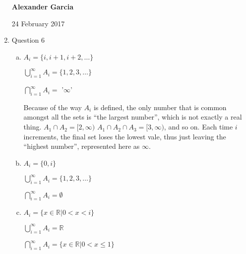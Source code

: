 \documentclass[11pt]{article}
\begin{document}
\begin{enumerate}
		\newpage

		\textbf{Alexander Garcia}

		24 February 2017 \\

	\item Question 6

		\begin{enumerate}[(a)]

		\item $A_i = \{i, i + 1, i + 2, \dots\}$

			$\bigcup\limits_{i = 1}^{\infty} A_i = \{1, 2, 3, \dots\}$

			$\bigcap\limits_{i = 1}^{\infty} A_i =$ '$\infty$'

			Because of the way $A_i$ is defined, the only number that is common amongst all the sets
			is ``the largest number'', which is not exactly a real thing. $A_1 \cap A_2 = [2, \infty)$
			$A_1 \cap A_2 \cap A_3 = [3, \infty)$, and so on. Each time $i$ increments, the final set loses
			the lowest vale, thus just leaving the ``highest number'', represented here as $\infty$.

		\item $A_i = \{0, i\}$

			$\bigcup\limits_{i = 1}^{\infty} A_i = \{1, 2, 3, \dots\}$

			$\bigcap\limits_{i = 1}^{\infty} A_i = \emptyset$

		\item $A_i = \{x \in \mathbb{R} | 0 < x < i\}$

			$\bigcup\limits_{i = 1}^{\infty} A_i = \mathbb{R}$

			$\bigcap\limits_{i = 1}^{\infty} A_i = \{x \in \mathbb{R} | 0 < x \leq 1\}$

		\end{enumerate}

\end{enumerate}
\end{document}
